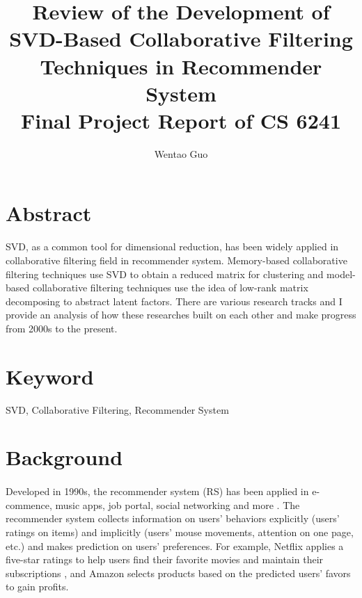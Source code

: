 \documentclass[letter paper, 11pt]{article}
\begin{document}
	
	
	\title{%
		Review of the Development of SVD-Based Collaborative Filtering Techniques in Recommender System \\
		\large Final Project Report of CS 6241}
	
	\author{Wentao Guo}
	
	\date{}
	
	\maketitle
	
	
	\section*{Abstract}		
	SVD, as a common tool for dimensional reduction, has been widely applied in collaborative filtering field in recommender system. Memory-based collaborative filtering techniques use SVD to obtain a reduced matrix for clustering and model-based collaborative filtering techniques use the idea of low-rank matrix decomposing to abstract latent factors. There are various research tracks and I provide an analysis of how these researches built on each other and make progress from 2000s to the present.
	
	
	\section*{Keyword}
	\begin{center}
	SVD, Collaborative Filtering, Recommender System
	\end{center}

	
	\section{Background} 
	\paragraph{}
	Developed in 1990s, the recommender system (RS) has been applied in e-commence, music apps, job portal, social networking and more \cite{netflix}. The recommender system collects information on users' behaviors explicitly (users' ratings on items) and implicitly (users' mouse movements, attention on one page, etc.) and makes prediction on users' preferences. For example, Netflix applies a five-star ratings to help users find their favorite movies and maintain their subscriptions \cite{gower}, and Amazon selects products based on the predicted users' favors to gain profits. 
	
\end{document}
